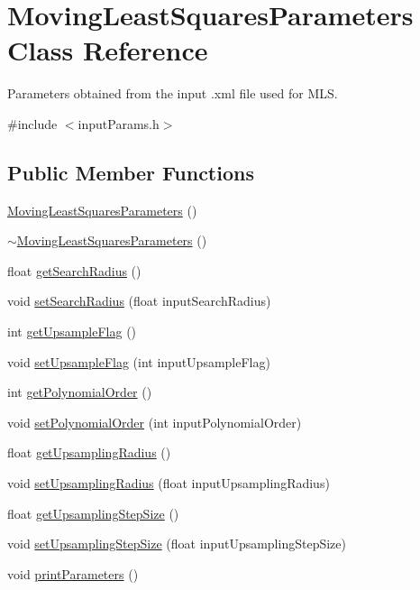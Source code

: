 \hypertarget{classMovingLeastSquaresParameters}{\section{Moving\-Least\-Squares\-Parameters Class Reference}
\label{classMovingLeastSquaresParameters}
}


Parameters obtained from the input .xml file used for M\-L\-S.  




{\ttfamily \#include $<$input\-Params.\-h$>$}

\subsection*{Public Member Functions}
\begin{DoxyCompactItemize}
\item 
\hyperlink{classMovingLeastSquaresParameters_a037ad2dabf83ba8f606f641d695dff67}{Moving\-Least\-Squares\-Parameters} ()
\item 
\hyperlink{classMovingLeastSquaresParameters_a0432d3af7dc7f05b4055e2a5c8b1822c}{$\sim$\-Moving\-Least\-Squares\-Parameters} ()
\item 
float \hyperlink{classMovingLeastSquaresParameters_a7d4bf21346d9b8d6023a0d577e368d5e}{get\-Search\-Radius} ()
\item 
void \hyperlink{classMovingLeastSquaresParameters_af1ec321c08fa729aea43697d23ca7fc1}{set\-Search\-Radius} (float input\-Search\-Radius)
\item 
int \hyperlink{classMovingLeastSquaresParameters_ab951e303536b6939906ed54d9ff00070}{get\-Upsample\-Flag} ()
\item 
void \hyperlink{classMovingLeastSquaresParameters_a0c1622628f30f6083c587738c2c2b879}{set\-Upsample\-Flag} (int input\-Upsample\-Flag)
\item 
int \hyperlink{classMovingLeastSquaresParameters_a86d01d68f39201787b3cfa300e90f0e3}{get\-Polynomial\-Order} ()
\item 
void \hyperlink{classMovingLeastSquaresParameters_a42769af72d720de1fa4f716a032c4dad}{set\-Polynomial\-Order} (int input\-Polynomial\-Order)
\item 
float \hyperlink{classMovingLeastSquaresParameters_a85a5a221593bc5dfdfbfb1678ae82191}{get\-Upsampling\-Radius} ()
\item 
void \hyperlink{classMovingLeastSquaresParameters_a49d5de8e0b705999e38c79523da6e49b}{set\-Upsampling\-Radius} (float input\-Upsampling\-Radius)
\item 
float \hyperlink{classMovingLeastSquaresParameters_aa2574247f027e72e87f59f12b1774a9e}{get\-Upsampling\-Step\-Size} ()
\item 
void \hyperlink{classMovingLeastSquaresParameters_a44ccceb4aba5c28776c9b681a3f98b27}{set\-Upsampling\-Step\-Size} (float input\-Upsampling\-Step\-Size)
\item 
void \hyperlink{classMovingLeastSquaresParameters_a20e510f8585e9b91b826c935c23569dc}{print\-Parameters} ()
\end{DoxyCompactItemize}
